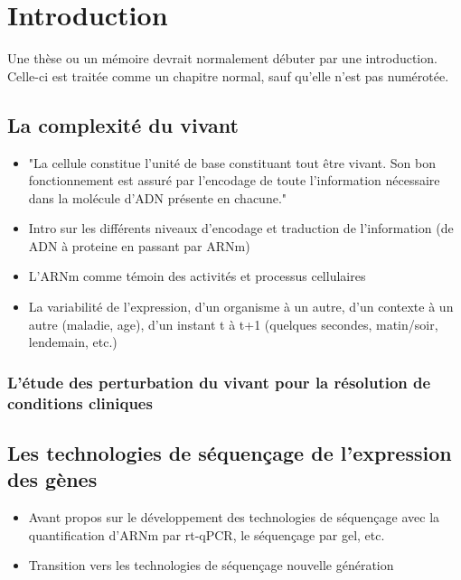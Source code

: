 \setcounter{chapter}{1}         %
\chapter*{Introduction}         %

Une thèse ou un mémoire devrait normalement débuter par une
introduction. Celle-ci est traitée comme un chapitre normal, sauf
qu'elle n'est pas numérotée.

\section{La complexité du vivant}
\begin{itemize}
\item "La cellule constitue l'unité de base constituant tout être vivant. Son bon fonctionnement est assuré par l'encodage de toute l'information nécessaire dans la molécule d'ADN présente en chacune."
\item Intro sur les différents niveaux d'encodage et traduction de l'information (de ADN à proteine en passant par ARNm)
\item L'ARNm comme témoin des activités et processus cellulaires
\item La variabilité de l'expression, d'un organisme à un autre, d'un contexte à un autre (maladie, age), d'un instant t à t+1 (quelques secondes, matin/soir, lendemain, etc.)
\end{itemize}

\subsection{L'étude des perturbation du vivant pour la résolution de conditions cliniques}

\section{Les technologies de séquençage de l'expression des gènes}
\begin{itemize}
\item Avant propos sur le développement des technologies de séquençage avec la quantification d'ARNm par rt-qPCR, le séquençage par gel, etc.
\item Transition vers les technologies de séquençage nouvelle génération
\end{itemize}

